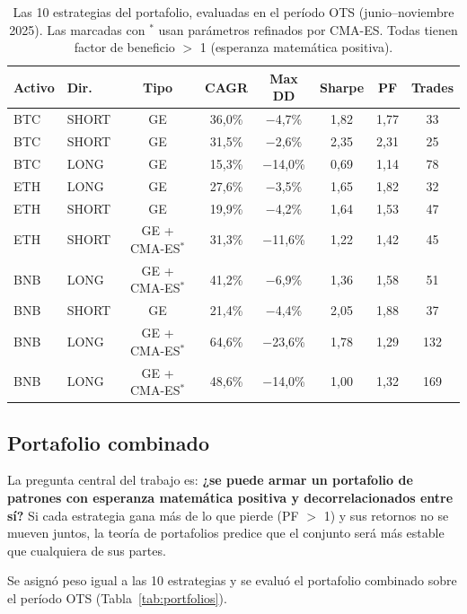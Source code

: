 \documentclass[12pt,a4paper]{article}
\begin{document}
\begin{table}[H]
\centering
\caption{Las 10 estrategias del portafolio, evaluadas en el período OTS
(junio--noviembre 2025). Las marcadas con $^*$ usan parámetros refinados por CMA-ES.
Todas tienen factor de beneficio $>$ 1 (esperanza matemática positiva).}
\label{tab:multi_portfolio}
\begin{tabular}{llcccccc}
\toprule
\textbf{Activo} & \textbf{Dir.} & \textbf{Tipo} & \textbf{CAGR} & \textbf{Max DD} & \textbf{Sharpe} & \textbf{PF} & \textbf{Trades} \\
\midrule
BTC & SHORT & GE & 36,0\% & $-$4,7\% & 1,82 & 1,77 & 33 \\
BTC & SHORT & GE & 31,5\% & $-$2,6\% & 2,35 & 2,31 & 25 \\
BTC & LONG  & GE & 15,3\% & $-$14,0\% & 0,69 & 1,14 & 78 \\
ETH & LONG  & GE & 27,6\% & $-$3,5\% & 1,65 & 1,82 & 32 \\
ETH & SHORT & GE & 19,9\% & $-$4,2\% & 1,64 & 1,53 & 47 \\
ETH & SHORT & GE + CMA-ES$^*$ & 31,3\% & $-$11,6\% & 1,22 & 1,42 & 45 \\
BNB & LONG  & GE + CMA-ES$^*$ & 41,2\% & $-$6,9\% & 1,36 & 1,58 & 51 \\
BNB & SHORT & GE & 21,4\% & $-$4,4\% & 2,05 & 1,88 & 37 \\
BNB & LONG  & GE + CMA-ES$^*$ & 64,6\% & $-$23,6\% & 1,78 & 1,29 & 132 \\
BNB & LONG  & GE + CMA-ES$^*$ & 48,6\% & $-$14,0\% & 1,00 & 1,32 & 169 \\
\bottomrule
\end{tabular}
\end{table}

\subsection{Portafolio combinado}

La pregunta central del trabajo es: \textbf{¿se puede armar un portafolio de patrones
con esperanza matemática positiva y decorrelacionados entre sí?} Si cada estrategia
gana más de lo que pierde (PF $>$ 1) y sus retornos no se mueven juntos, la teoría
de portafolios predice que el conjunto será más estable que cualquiera de sus partes.

Se asignó peso igual a las 10 estrategias y se evaluó el portafolio combinado sobre
el período OTS (Tabla~\ref{tab:portfolios}).
\end{document}
